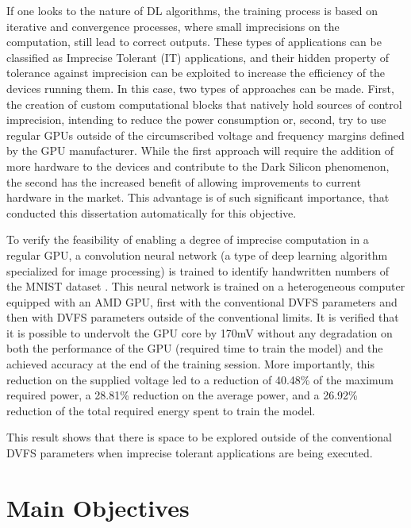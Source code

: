 If one looks to the nature of DL algorithms, the training process is based on iterative and convergence processes, where small imprecisions on the computation, still lead to correct outputs. These types of applications can be classified as Imprecise Tolerant (IT) applications, and their hidden property of tolerance against imprecision can be exploited to increase the efficiency of the devices running them. In this case, two types of approaches can be made. First, the creation of custom computational blocks that natively hold sources of control imprecision, intending to reduce the power consumption \cite{mahdiani_efficient_2017} or, second, try to use regular GPUs outside of the circumscribed voltage and frequency margins defined by the GPU manufacturer. While the first approach will require the addition of more hardware to the devices and contribute to the Dark Silicon phenomenon, the second has the increased benefit of allowing improvements to current hardware in the market. This advantage is of such significant importance, that conducted this dissertation automatically for this objective.

To verify the feasibility of enabling a degree of imprecise computation in a regular GPU, a convolution neural network (a type of deep learning algorithm specialized for image processing) is trained to identify handwritten numbers of the MNIST dataset \cite{noauthor_mnist_1999}. This neural network is trained on a heterogeneous computer equipped with an AMD GPU, first with the conventional DVFS parameters and then with DVFS parameters outside of the conventional limits. It is verified that it is possible to undervolt the GPU core by 170mV without any degradation on both the performance of the GPU (required time to train the model) and the achieved accuracy at the end of the training session. More importantly, this reduction on the supplied voltage led to a reduction of 40.48\% of the maximum required power, a 28.81\% reduction on the average power, and a 26.92\% reduction of the total required energy spent to train the model.

This result shows that there is space to be explored outside of the conventional DVFS parameters when imprecise tolerant applications are being executed.


\section{Main Objectives}
\label{section:objectives}

